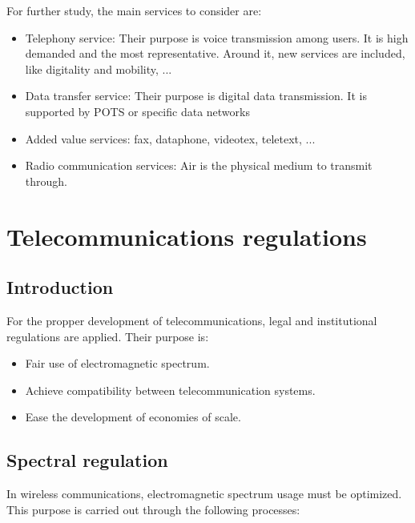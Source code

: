 \documentclass[
	12pt,
	twoside
]{book}
\begin{document}
For further study, the main services to consider are:

\begin{itemize}
	\item Telephony service: Their purpose is voice transmission among users. It is high demanded and the most representative. Around it, new services are included, like digitality and mobility, ...
	\item Data transfer service: Their purpose is digital data transmission. It is supported by POTS or specific data networks
	\item Added value services: fax, dataphone, videotex, teletext, ...
	\item Radio communication services: Air is the physical medium to transmit through.
\end{itemize}

\section{Telecommunications regulations}

\subsection{Introduction}

For the propper development of telecommunications, legal and institutional regulations are applied. Their purpose is:

\begin{itemize}
	\item Fair use of electromagnetic spectrum.
	\item Achieve compatibility between telecommunication systems.
	\item Ease the development of economies of scale.
\end{itemize}

\subsection{Spectral regulation}

In wireless communications, electromagnetic spectrum usage must be optimized. This purpose is carried out through the following processes:
\end{document}
